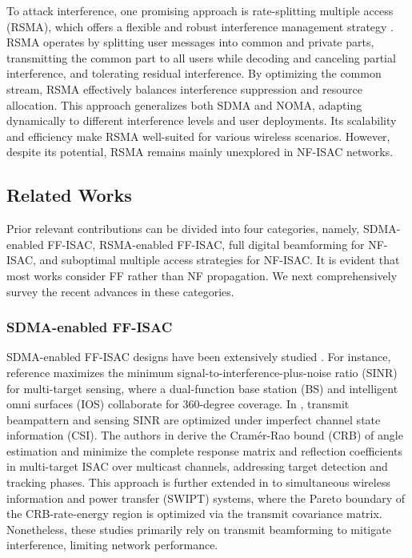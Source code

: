 \documentclass[10pt,journal,twocolumn]{IEEEtran}
\begin{document}
To attack interference, one promising approach is rate-splitting multiple access (RSMA), which offers a flexible and robust interference management strategy \cite{10273395,10038476}. RSMA operates by splitting user messages into common and private parts, transmitting the common part to all users while decoding and canceling partial interference, and tolerating residual interference. By optimizing the common stream, RSMA effectively balances interference suppression and resource allocation. This approach generalizes both SDMA and NOMA, adapting dynamically to different interference levels and user deployments. Its scalability and efficiency make RSMA well-suited for various wireless scenarios. However, despite its potential, RSMA remains mainly unexplored in NF-ISAC networks.


\subsection{Related Works}
Prior relevant contributions can be divided into four categories, namely, SDMA-enabled FF-ISAC\cite{10464353,10679658,10251151,10382465}, RSMA-enabled FF-ISAC\cite{gong2024hybrid,10486996,10032141,10522473,10287099}, full digital beamforming for NF-ISAC\cite{10520715,10694020,hua2024near,10681603}, and suboptimal multiple access strategies for NF-ISAC\cite{10135096,meng2024hybrid,10700785,10579914}. It is evident that most works consider FF rather than NF propagation.  We next comprehensively survey the recent advances in these categories.



\subsubsection{SDMA-enabled FF-ISAC} SDMA-enabled FF-ISAC designs have been extensively studied \cite{10464353,10679658,10251151,10382465}. For instance, reference \cite{10464353} maximizes the minimum signal-to-interference-plus-noise ratio (SINR) for multi-target sensing, where a dual-function base station (BS) and intelligent omni surfaces (IOS) collaborate for 360-degree coverage. In \cite{10679658}, transmit beampattern and sensing SINR are optimized under imperfect channel state information (CSI). The authors in \cite{10251151} derive the Cram\'{e}r-Rao bound (CRB) of angle estimation and minimize the complete response matrix and reflection coefficients in multi-target ISAC over multicast channels, addressing target detection and tracking phases. This approach is further extended in \cite{10382465} to simultaneous wireless information and power transfer (SWIPT) systems, where the Pareto boundary of the CRB-rate-energy region is optimized via the transmit covariance matrix. Nonetheless, these studies primarily rely on transmit beamforming to mitigate interference, limiting network performance.
\end{document}
